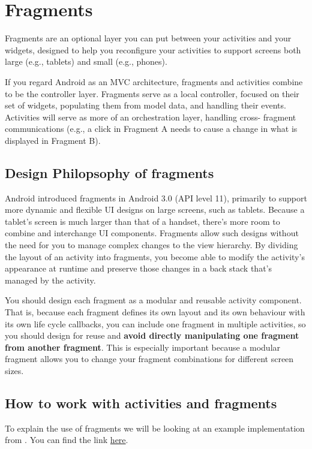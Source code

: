 
\chapter{Fragments}
Fragments are an optional layer you can put between your activities and your
widgets, designed to help you reconfigure your activities to support screens both
large (e.g., tablets) and small (e.g., phones). 

If you regard Android as an MVC architecture, fragments and
activities combine to be the controller layer. Fragments serve as a local controller, focused on their set of widgets, populating them from model data, and handling
their events. Activities will serve as more of an orchestration layer, handling cross-
fragment communications (e.g., a click in Fragment A needs to cause a change in what is displayed in Fragment B).

\section{Design Philopsophy of fragments}
Android introduced fragments in Android 3.0 (API level 11), primarily to support more dynamic and flexible UI designs on large screens, such as tablets. Because a tablet's screen is much larger than that of a handset, there's more room to combine and interchange UI components. Fragments allow such designs without the need for you to manage complex changes to the view hierarchy. By dividing the layout of an activity into fragments, you become able to modify the activity's appearance at runtime and preserve those changes in a back stack that's managed by the activity.

You should design each fragment as a modular and reusable activity component. That is, because each fragment defines its own layout and its own behaviour with its own life cycle callbacks, you can include one fragment in multiple activities, so you should design for reuse and \textbf{avoid directly manipulating one fragment from another fragment}. This is especially important because a modular fragment allows you to change your fragment combinations for different screen sizes.

\section{How to work with activities and fragments}
To explain the use of fragments we will be looking at an example implementation from  \cite{murphymarkl.2017}. You can find the link \href{https://github.com/commonsguy/cw-omnibus/tree/master/Fragments/Static}{here}.

